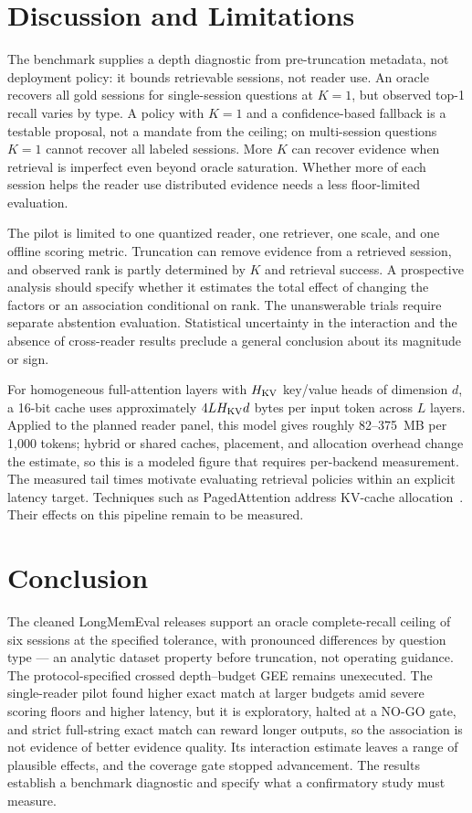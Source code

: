\section{Discussion and Limitations}

The benchmark supplies a depth diagnostic from pre-truncation metadata, not deployment policy: it bounds retrievable sessions, not reader use. An oracle recovers all gold sessions for single-session questions at $K=1$, but observed top-1 recall varies by type. A policy with $K=1$ and a confidence-based fallback is a testable proposal, not a mandate from the ceiling; on multi-session questions $K=1$ cannot recover all labeled sessions. More $K$ can recover evidence when retrieval is imperfect even beyond oracle saturation. Whether more of each session helps the reader use distributed evidence needs a less floor-limited evaluation.

The pilot is limited to one quantized reader, one retriever, one scale, and one offline scoring metric. Truncation can remove evidence from a retrieved session, and observed rank is partly determined by $K$ and retrieval success. A prospective analysis should specify whether it estimates the total effect of changing the factors or an association conditional on rank. The unanswerable trials require separate abstention evaluation. Statistical uncertainty in the interaction and the absence of cross-reader results preclude a general conclusion about its magnitude or sign.

For homogeneous full-attention layers with $H_{\rm KV}$ key/value heads of dimension $d$, a 16-bit cache uses approximately $4LH_{\rm KV}d$ bytes per input token across $L$ layers. Applied to the planned reader panel, this model gives roughly 82--375~MB per 1,000 tokens; hybrid or shared caches, placement, and allocation overhead change the estimate, so this is a modeled figure that requires per-backend measurement. The measured tail times motivate evaluating retrieval policies within an explicit latency target. Techniques such as PagedAttention address KV-cache allocation~\cite{kwon2023pagedattention}. Their effects on this pipeline remain to be measured.

\section{Conclusion}

The cleaned LongMemEval releases support an oracle complete-recall ceiling of six sessions at the specified tolerance, with pronounced differences by question type --- an analytic dataset property before truncation, not operating guidance. The protocol-specified crossed depth--budget GEE remains unexecuted. The single-reader pilot found higher exact match at larger budgets amid severe scoring floors and higher latency, but it is exploratory, halted at a NO-GO gate, and strict full-string exact match can reward longer outputs, so the association is not evidence of better evidence quality. Its interaction estimate leaves a range of plausible effects, and the coverage gate stopped advancement. The results establish a benchmark diagnostic and specify what a confirmatory study must measure.

